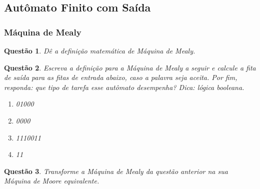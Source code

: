 \documentclass{article}
\newtheorem{problem}{Questão}
\begin{document}
    \subsection{Autômato Finito com Saída}
    
        \subsubsection{Máquina de Mealy}
            \begin{problem}
                    Dê a definição matemática de Máquina de Mealy.
            \end{problem}
            \begin{solution}
        
    \end{solution}
            \begin{problem}
                    Escreva a definição para a Máquina de Mealy a seguir e calcule a fita de saída para as fitas de entrada abaixo, caso a palavra seja aceita. Por fim, responda: que tipo de tarefa esse autômato desempenha? Dica: lógica booleana.
                    
                    \begin{enumerate}[label=(\alph*)]
                        \item 01000
                        \item 0000
                        \item 1110011
                        \item 11
                    \end{enumerate}
            
            \end{problem}
            \begin{solution}
        
    \end{solution}
            \begin{problem}
                  Transforme a Máquina de Mealy da questão anterior na sua Máquina de Moore equivalente.
            \end{problem}
            \begin{solution}
        
    \end{solution}
\end{document}

